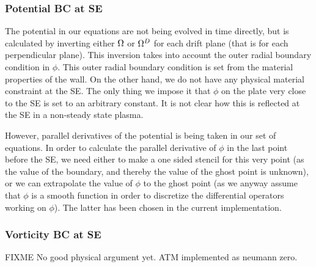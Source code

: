 \subsubsection{Potential BC at SE}
%
The potential in our equations are not being evolved in time directly, but is
calculated by inverting either $\Omega$ or $\Omega^D$ for each drift plane (that is
for each perpendicular plane). This inversion takes into account the
outer radial boundary condition in $\phi$. This outer radial boundary condition
is set from the material properties of the wall. On the other hand, we do not
have any physical material constraint at the SE. The only thing we impose it
that $\phi$ on the plate very close to the SE is set to an arbitrary constant.
It is not clear how this is reflected at the SE in a non-steady state plasma.

However, parallel derivatives of the potential is being taken in our set of
equations. In order to calculate the parallel derivative of $\phi$ in the last
point before the SE, we need either to make a one sided stencil for this very
point (as the value of the boundary, and thereby the value of the ghost point
is unknown), or we can extrapolate the value of $\phi$ to the ghost point (as
we anyway assume that $\phi$ is a smooth function in order to discretize the
differential operators working on $\phi$). The latter has been chosen in the
current implementation.

\subsubsection{Vorticity BC at SE}
%
%
FIXME
No good physical argument yet. ATM implemented as neumann zero.

